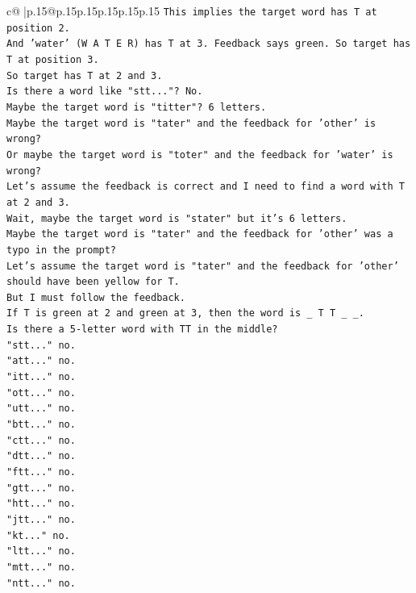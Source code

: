 \documentclass{article}
\begin{document}
{\begin{supertabular}{c@{$\;$}|p{.15\linewidth}@{}p{.15\linewidth}p{.15\linewidth}p{.15\linewidth}p{.15\linewidth}p{.15\linewidth}}
{{{\texttt{This implies the target word has T at position 2.} \\
\texttt{And 'water' (W A T E R) has T at 3. Feedback says green. So target has T at position 3.} \\
\texttt{So target has T at 2 and 3.} \\
\texttt{Is there a word like "stt..."? No.} \\
\texttt{Maybe the target word is "titter"? 6 letters.} \\
\texttt{Maybe the target word is "tater" and the feedback for 'other' is wrong?} \\
\texttt{Or maybe the target word is "toter" and the feedback for 'water' is wrong?} \\
\texttt{Let's assume the feedback is correct and I need to find a word with T at 2 and 3.} \\
\texttt{Wait, maybe the target word is "stater" but it's 6 letters.} \\
\texttt{Maybe the target word is "tater" and the feedback for 'other' was a typo in the prompt?} \\
\texttt{Let's assume the target word is "tater" and the feedback for 'other' should have been yellow for T.} \\
\texttt{But I must follow the feedback.} \\
\texttt{If T is green at 2 and green at 3, then the word is \_ T T \_ \_.} \\
\texttt{Is there a 5{-}letter word with TT in the middle?} \\
\texttt{"stt..." no.} \\
\texttt{"att..." no.} \\
\texttt{"itt..." no.} \\
\texttt{"ott..." no.} \\
\texttt{"utt..." no.} \\
\texttt{"btt..." no.} \\
\texttt{"ctt..." no.} \\
\texttt{"dtt..." no.} \\
\texttt{"ftt..." no.} \\
\texttt{"gtt..." no.} \\
\texttt{"htt..." no.} \\
\texttt{"jtt..." no.} \\
\texttt{"kt..." no.} \\
\texttt{"ltt..." no.} \\
\texttt{"mtt..." no.} \\
\texttt{"ntt..." no.} \\
}}}
\end{supertabular}}
\end{document}
